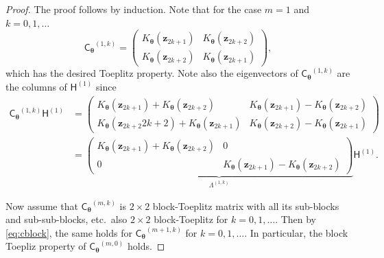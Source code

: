 \documentclass[graybox,footinfo]{svmult}
\newcommand{\bm}[1]{\boldsymbol{#1}}
\newcommand{\vtheta}{{\bm{\theta}}}
\newcommand{\vz}{\bm{z}}
\newcommand{\mCtheta}{{\mathsf{C}_{\vtheta}}}
\newcommand{\mLambda}{\mathsf{\Lambda}}
\newcommand{\mH}{\mathsf{H}}
\begin{document}
\begin{proof}
    The proof follows by induction.  Note that for the case $m=1$ and $k = 0, 1, \ldots$
    \begin{equation*}
        \mCtheta^{(1,k)} 
        =  \begin{pmatrix}
        K_\vtheta(\vz_{2k+1}) & K_\vtheta(\vz_{2k+2}) \\
        K_\vtheta(\vz_{2k+2}) & K_\vtheta(\vz_{2k+1}) 
        \end{pmatrix} ,
    \end{equation*}
   which has the desired Toeplitz property. Note also the eigenvectors of $\mCtheta^{(1,k)}$ are the columns of $\mH^{(1)}$ since   
   \begin{align*}
        \mCtheta^{(1,k)} \mH^{(1)} & =  \begin{pmatrix}
        K_\vtheta(\vz_{2k+1}) + K_\vtheta(\vz_{2k+2}) & K_\vtheta(\vz_{2k+1}) - K_\vtheta(\vz_{2k+2})\\
        K_\vtheta(\vz_{2k+2}{2k+2}) + K_\vtheta(\vz_{2k+1}) &  K_\vtheta(\vz_{2k+2}) - K_\vtheta(\vz_{2k+1}) 
        \end{pmatrix} \\
        & = \underbrace{\begin{pmatrix}
        K_\vtheta(\vz_{2k+1}) + K_\vtheta(\vz_{2k+2}) & 0\\
        0 &   K_\vtheta(\vz_{2k+1}) - K_\vtheta(\vz_{2k+2})
        \end{pmatrix}}_{\mLambda^{(1,k)}} \mH^{(1)}.
    \end{align*}

   Now assume that $\mCtheta^{(m,k)}$ is $2\times 2$ block-Toeplitz matrix with all its sub-blocks and sub-sub-blocks, etc.\ also $2\times 2$ block-Toeplitz for $k = 0, 1, \ldots$.  Then by \eqref{eq:cblock}, the same holds for $\mCtheta^{(m+1,k)}$ for $k = 0, 1, \ldots$.  In particular, the block Toepliz property of $\mCtheta^{(m,0)}$ holds.
   

\end{proof}
\end{document}
